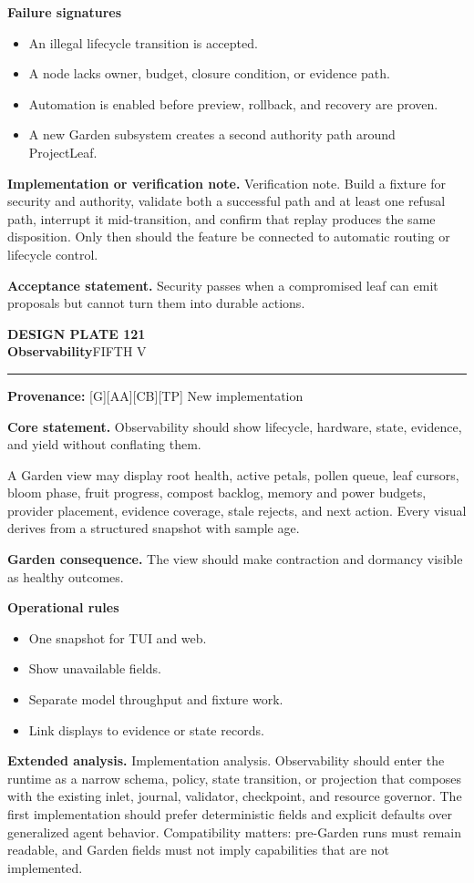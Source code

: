 \documentclass[10pt,letterpaper,oneside]{article}
\newcommand{\prov}[1]{\textcolor{gardenBlue}{\sffamily\footnotesize\textbf{Provenance:} #1}}
\newcommand{\platetitle}[3]{%
  \begin{minipage}[t][0.54in][t]{\textwidth}
  {\sffamily\bfseries\color{gardenDeep}\fontsize{9}{10}\selectfont DESIGN PLATE #1}\\[-1pt]
  {\sffamily\bfseries\color{gardenInk}\fontsize{16.5}{18}\selectfont #2}\hfill{\sffamily\color{gardenGreen}\large #3}
  \end{minipage}\vspace{-2pt}\hrule\vspace{5pt}}
\begin{document}
\textbf{Failure signatures}
\begin{itemize}
\item An illegal lifecycle transition is accepted.
\item A node lacks owner, budget, closure condition, or evidence path.
\item Automation is enabled before preview, rollback, and recovery are proven.
\item A new Garden subsystem creates a second authority path around ProjectLeaf.
\end{itemize}
\textbf{Implementation or verification note.} Verification note. Build a fixture for security and authority, validate both a successful path and at least one refusal path, interrupt it mid-transition, and confirm that replay produces the same disposition. Only then should the feature be connected to automatic routing or lifecycle control.

\begin{acceptbox}
\textbf{Acceptance statement.} Security passes when a compromised leaf can emit proposals but cannot turn them into durable actions.
\end{acceptbox}
\newpage
\platetitle{121}{Observability}{FIFTH V}
\prov{[G][AA][CB][TP] New implementation}
\fontsize{8.85}{10.45}\selectfont
\begin{corebox}
\textbf{Core statement.} Observability should show lifecycle, hardware, state, evidence, and yield without conflating them.
\end{corebox}
A Garden view may display root health, active petals, pollen queue, leaf cursors, bloom phase, fruit progress, compost backlog, memory and power budgets, provider placement, evidence coverage, stale rejects, and next action. Every visual derives from a structured snapshot with sample age.

\textbf{Garden consequence.} The view should make contraction and dormancy visible as healthy outcomes.

\textbf{Operational rules}
\begin{itemize}
\item One snapshot for TUI and web.
\item Show unavailable fields.
\item Separate model throughput and fixture work.
\item Link displays to evidence or state records.
\end{itemize}
\textbf{Extended analysis.} Implementation analysis. Observability should enter the runtime as a narrow schema, policy, state transition, or projection that composes with the existing inlet, journal, validator, checkpoint, and resource governor. The first implementation should prefer deterministic fields and explicit defaults over generalized agent behavior. Compatibility matters: pre-Garden runs must remain readable, and Garden fields must not imply capabilities that are not implemented.
\end{document}
